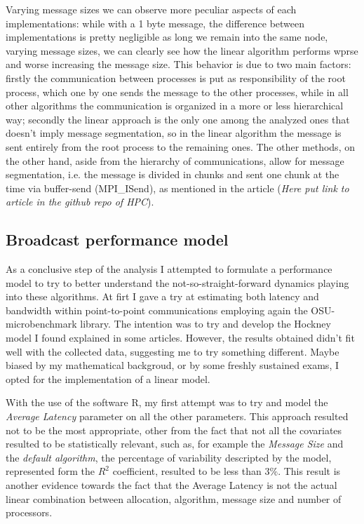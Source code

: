 \documentclass{article}
\begin{document}
	Varying message sizes we can observe more peculiar aspects of each implementations: while with a 1 byte message, the difference between implementations is pretty negligible as long we remain into the same node, varying message sizes, we can clearly see how the linear algorithm performs wprse and worse increasing the message size.
	This behavior is due to two main factors: firstly the communication between processes is put as responsibility of the root process, which one by one sends the message to the other processes, while in all other algorithms the communication is organized in a more or less hierarchical way; secondly the linear approach is the only one among the analyzed ones that doesn't imply message segmentation, so in the linear algorithm the message is sent entirely from the root process to the remaining ones. The other methods, on the other hand, aside from the hierarchy of communications, allow for message segmentation, i.e. the message is divided in chunks and sent one chunk at the time via buffer-send (MPI\_ISend), as mentioned in the article (\textit{Here put link to article in the github repo of HPC}).
	
	\subsection{Broadcast performance model}
	As a conclusive step of the analysis I attempted to formulate a performance model to try to better understand the not-so-straight-forward dynamics playing into these algorithms. 
	At firt I gave a try at estimating both latency and bandwidth within point-to-point communications employing again the OSU-microbenchmark library. The intention was to try and develop the Hockney model I found explained in some articles. However, the results obtained didn't fit well with the collected data, suggesting me to try something different. Maybe biased by my mathematical backgroud, or by some freshly sustained exams, I opted for the implementation of a linear model.
	
	With the use of the software R, my first attempt was to try and model the \textit{Average Latency} parameter on all the other parameters. This approach resulted not to be the most appropriate, other from the fact that not all the covariates resulted to be statistically relevant, such as, for example the \textit{Message Size} and the \textit{default algorithm}, the percentage of variability descripted by the model, represented form the $R^2$ coefficient, resulted to be less than $3\%$.
	This result is another evidence towards the fact that the Average Latency is not the actual linear combination between allocation, algorithm, message size and number of processors.
	
\end{document}
